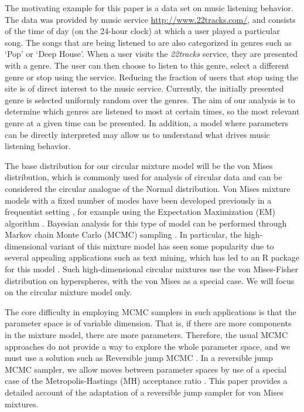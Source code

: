 The motivating example for this paper is a data set on music listening behavior. The data was provided by music service \href{22tracks}{\url{http://www.22tracks.com/}}, and consists of the time of day (on the 24-hour clock) at which a user played a particular song. The songs that are being listened to are also categorized in genres such as `Pop' or `Deep House'. When a user visits the \textit{22tracks} service, they are presented with a genre. The user can then choose to listen to this genre, select a different genre or stop using the service. Reducing the fraction of users that stop using the site is of direct interest to the music service. Currently, the initially presented genre is selected uniformly random over the genres. The aim of our analysis is to determine which genres are listened to most at certain times, so the most relevant genre at a given time can be presented. In addition, a model where parameters can be directly interpreted may allow us to understand what drives music listening behavior.


The base distribution for our circular mixture model will be the von Mises distribution, which is commonly used for analysis of circular data and can be considered the circular analogue of the Normal distribution. Von Mises mixture models with a fixed number of modes have been developed previously in a frequentist setting \citep{mooney2003fitting}, for example using the Expectation Maximization (EM) algorithm \citep{McLachlan:P5Bg7scy, Banerjee:2005tk}. Bayesian analysis for this type of model can be performed through Markov chain Monte Carlo (MCMC) sampling \citep{Tierney:1994fc, Besag:1995de}. In particular, the high-dimensional variant of this mixture model has seen some popularity due to several appealing applications such as text mining, which has led to an R package for this model \citep{hornik2014movmf}. Such high-dimensional circular mixtures use the von Mises-Fisher distribution on hyperspheres, with the von Mises as a special case. We will focus on the circular mixture model only. 

The core difficulty in employing MCMC samplers in such applications is that the parameter space is of variable dimension. That is, if there are more components in the mixture model, there are more parameters. Therefore, the usual MCMC approaches do not provide a way to explore the whole parameter space, and we must use a solution such as Reversible jump MCMC \citep{Green:1995ut, Richardson:1997di}. In a reversible jump MCMC sampler, we allow moves between parameter spaces by use of a special case of the Metropolis-Hastings (MH) acceptance ratio \citep{Hastings:1970wm}. This paper provides a detailed account of the adaptation of a reversible jump sampler for von Mises mixtures. 

